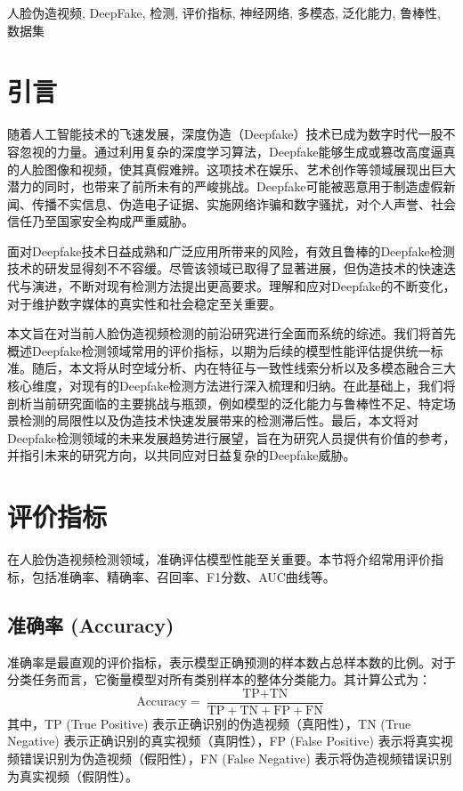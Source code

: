 \documentclass[conference]{IEEEtran}
\begin{document}
\begin{IEEEkeywords}
人脸伪造视频, DeepFake, 检测, 评价指标, 神经网络, 多模态, 泛化能力, 鲁棒性, 数据集
\end{IEEEkeywords}

\section{引言}
随着人工智能技术的飞速发展，深度伪造（Deepfake）技术已成为数字时代一股不容忽视的力量。通过利用复杂的深度学习算法，Deepfake能够生成或篡改高度逼真的人脸图像和视频，使其真假难辨。这项技术在娱乐、艺术创作等领域展现出巨大潜力的同时，也带来了前所未有的严峻挑战。Deepfake可能被恶意用于制造虚假新闻、传播不实信息、伪造电子证据、实施网络诈骗和数字骚扰，对个人声誉、社会信任乃至国家安全构成严重威胁。

面对Deepfake技术日益成熟和广泛应用所带来的风险，有效且鲁棒的Deepfake检测技术的研发显得刻不不容缓。尽管该领域已取得了显著进展，但伪造技术的快速迭代与演进，不断对现有检测方法提出更高要求。理解和应对Deepfake的不断变化，对于维护数字媒体的真实性和社会稳定至关重要。

本文旨在对当前人脸伪造视频检测的前沿研究进行全面而系统的综述。我们将首先概述Deepfake检测领域常用的评价指标，以期为后续的模型性能评估提供统一标准。随后，本文将从时空域分析、内在特征与一致性线索分析以及多模态融合三大核心维度，对现有的Deepfake检测方法进行深入梳理和归纳。在此基础上，我们将剖析当前研究面临的主要挑战与瓶颈，例如模型的泛化能力与鲁棒性不足、特定场景检测的局限性以及伪造技术快速发展带来的检测滞后性。最后，本文将对Deepfake检测领域的未来发展趋势进行展望，旨在为研究人员提供有价值的参考，并指引未来的研究方向，以共同应对日益复杂的Deepfake威胁。

\section{评价指标}
在人脸伪造视频检测领域，准确评估模型性能至关重要。本节将介绍常用评价指标，包括准确率、精确率、召回率、F1分数、AUC曲线等。

\subsection{准确率 (Accuracy)}
准确率是最直观的评价指标，表示模型正确预测的样本数占总样本数的比例。对于分类任务而言，它衡量模型对所有类别样本的整体分类能力。其计算公式为：
$$ \text{Accuracy} = \frac{\text{TP} + \text{TN}}{\text{TP} + \text{TN} + \text{FP} + \text{FN}} $$
其中，TP (True Positive) 表示正确识别的伪造视频（真阳性），TN (True Negative) 表示正确识别的真实视频（真阴性），FP (False Positive) 表示将真实视频错误识别为伪造视频（假阳性），FN (False Negative) 表示将伪造视频错误识别为真实视频（假阴性）。
\end{document}

